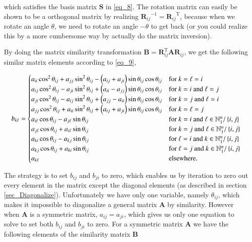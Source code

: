 \documentclass[11pt,english,a4paper]{article}
\begin{document}
\begin{flushleft}
which satisfies the basis matrix $\mathbf{S}$ in \eqref{eq_8}. The rotation matrix can easily be shown to be a orthogonal matrix by realizing ${\mathbf{R}_{ij}}^{-1} = {\mathbf{R}_{ij}}^{\mathrm{T}}$, because when we rotate an angle $\theta$, we need to rotate an angle $-\theta$ to get back (or you could realize this by a more cumbersome way by actually do the matrix inversion). \linebreak

By doing the matrix similarity transformation $\mathbf{B} = \mathbf{R}_{ij}^{\text{T}}\mathbf{A}\mathbf{R}_{ij}$, we get the following similar matrix elements according to \eqref{eq_9},

\begin{align*}
b_{k\ell} = \begin{cases} a_{ii} \cos^2\theta_{ij}  + a_{jj}\sin^2 \theta_{ij} - \left({a_{ij} + a_{ji}}\right)\sin\theta_{ij}\cos\theta_{ij} & \text{for $k=\ell=i$} \\ a_{ij}\cos^2\theta_{ij} - a_{ji}\sin^2\theta_{ij} + \left({a_{ii}-a_{jj}}\right)\sin\theta_{ij}\cos\theta_{ij} & \text{for $k=i$ and $\ell = j$} \\ a_{ji}\cos^2\theta_{ij} - a_{ij}\sin^2\theta_{ij} + \left({a_{jj}-a_{ii}}\right)\sin\theta_{ij}\cos\theta_{ij} & \text{for $k=j$ and $\ell=i$} \\ a_{jj} \cos^2\theta_{ij}  + a_{ii}\sin^2 \theta_{ij} + \left({a_{ij} + a_{ji}}\right)\sin\theta_{ij}\cos\theta_{ij} & \text{for $k=\ell=j$} \\ a_{i \ell} \cos\theta_{ij} -  a_{j\ell} \sin\theta_{ij} & \text{for $k=i$ and $\ell\in\mathbb{N}_1^n / \left\lbrace{i,j}\right\rbrace$} \\ a_{j\ell} \cos\theta_{ij} + a_{i\ell}\sin\theta_{ij} & \text{for $k=j$ and $\ell\in\mathbb{N}_1^n / \left\lbrace{i,j}\right\rbrace$} \\ a_{ki} \cos\theta_{ij} - a_{kj}\sin\theta_{ij} & \text{for $\ell=i$ and $k\in\mathbb{N}_1^n / \left\lbrace{i,j}\right\rbrace$} \\ a_{kj}\cos\theta_{ij} + a_{ki}\sin\theta_{ij} & \text{for $\ell=j$ and $k\in\mathbb{N}_1^n / \left\lbrace{i,j}\right\rbrace$} \\ a_{k\ell} & \text{elsewhere.}\end{cases}
\end{align*}

The strategy is to set $b_{ij}$ and $b_{ji}$ to zero, which enables us by iteration to zero out every element in the matrix except the diagonal elements (as described in section \ref{sec_Diagonalize}). Unfortunately we have only one variable, namely $\theta_{ij}$, which makes it impossible to diagonalize a general matrix $\mathbf{A}$ by similarity. However when $\mathbf{A}$ is a symmetric matrix, $a_{ij}=a_{ji}$, which gives us only one equation to solve to set both $b_{ij}$ and $b_{ji}$ to zero. For a symmetric matrix $\mathbf{A}$ we have the following elements of the similarity matrix $\mathbf{B}$


\end{flushleft}
\end{document}

